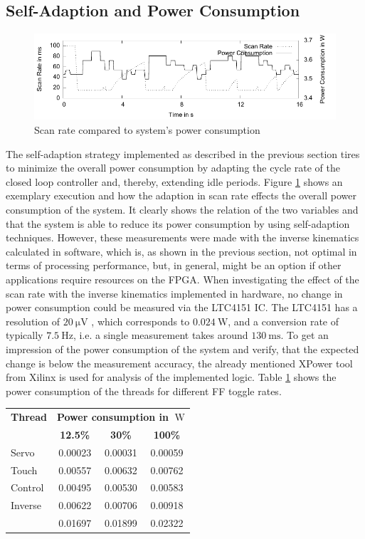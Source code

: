 \subsection{Self-Adaption and Power Consumption}
\begin{figure}
	\centering
	\includegraphics{../figures/selfadapt_pw}
	\caption{Scan rate compared to system's power consumption}
	\label{fig:selfadapt_pw}
\end{figure}
The self-adaption strategy implemented as described in the previous section
tires to minimize the overall power consumption by adapting the cycle rate of
the closed loop controller and, thereby, extending idle periods. Figure
\ref{fig:selfadapt_pw} shows an exemplary execution and how the adaption in
scan rate effects the overall power consumption of the system. It clearly
shows the relation of the two variables and that the system is able to reduce
its power consumption by using self-adaption techniques. However, these
measurements were made with the inverse kinematics calculated in software,
which is, as shown in the previous section, not optimal in terms of processing
performance, but, in general, might be an option if other applications require
resources on the \ac{FPGA}. When investigating the effect of the scan rate
with the inverse kinematics implemented in hardware, no change in power
consumption could be measured via the LTC4151 \ac{IC}. The LTC4151 has a
resolution of $\SI{20}{\micro\volt}$ \citep{LTC4151}, which corresponds to
$\SI{0.024}{\watt}$, and a conversion rate of typically $\SI{7.5}{\hertz}$,
i.e. a single measurement takes around $\SI{130}{\milli\second}$. To get an
impression of the power consumption of the system and verify, that the
expected change is below the measurement accuracy, the already mentioned
XPower tool from Xilinx is used for analysis of the implemented logic. Table
\ref{tab:xpower} shows the power consumption of the threads for different
\ac{FF} toggle rates.
\begin{table}
	\scriptsize
	\centering
	\label{tab:xpower}
	\begin{tabular}{lccc}
	\hline
	\textbf{Thread} & \multicolumn{3}{c}{\textbf{Power consumption in $\SI{}{\watt}$}}\\
	& \textbf{12.5\%} & \textbf{30\%} & \textbf{100\%}\\
	\hline
	Servo & 0.00023 & 0.00031 & 0.00059\\
	Touch & 0.00557 & 0.00632 & 0.00762\\
	Control & 0.00495 & 0.00530 & 0.00583\\
	Inverse & 0.00622 & 0.00706 & 0.00918\\
	\hline
	& 0.01697 & 0.01899 & 0.02322\\
	\hline
	\end{tabular}
\end{table}
